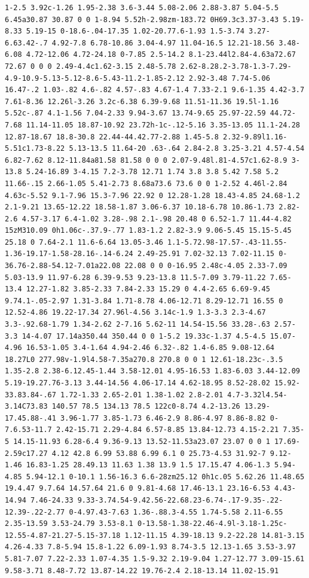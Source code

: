 \documentclass[11pt]{article}
\begin{document}
\begin{enumerate}
\begin{verbatim}
1-2.5 3.92c-1.26 1.95-2.38 3.6-3.44 5.08-2.06 2.88-3.87 5.04-5.5 6.45a30.87 30.87 0 0 1-8.94 5.52h-2.98zm-183.72 0H69.3c3.37-3.43 5.19-8.33 5.19-15 0-18.6-.04-17.35 1.02-20.77.6-1.93 1.5-3.74 3.27-6.63.42-.7 4.92-7.8 6.78-10.86 3.04-4.97 11.04-16.5 12.21-18.56 3.48-6.08 4.72-12.06 4.72-24.18 0-7.85 2.5-14.2 8.1-23.44l2.84-4.63a72.67 72.67 0 0 0 2.49-4.4c1.62-3.15 2.48-5.78 2.62-8.28.2-3.78-1.3-7.29-4.9-10.9-5.13-5.12-8.6-5.43-11.2-1.85-2.12 2.92-3.48 7.74-5.06 16.47-.2 1.03-.82 4.6-.82 4.57-.83 4.67-1.4 7.33-2.1 9.6-1.35 4.42-3.7 7.61-8.36 12.26l-3.26 3.2c-6.38 6.39-9.68 11.51-11.36 19.5l-1.16 5.52c-.87 4.1-1.56 7.04-2.33 9.94-3.67 13.74-9.65 25.97-22.59 44.72-7.68 11.14-11.05 18.87-10.92 23.72h-1c-.12-5.16 3.35-13.05 11.1-24.28 12.87-18.67 18.8-30.8 22.44-44.42.77-2.88 1.45-5.8 2.32-9.89l1.16-5.51c1.73-8.22 5.13-13.5 11.64-20 .63-.64 2.84-2.8 3.25-3.21 4.57-4.54 6.82-7.62 8.12-11.84a81.58 81.58 0 0 0 2.07-9.48l.81-4.57c1.62-8.9 3-13.8 5.24-16.89 3-4.15 7.2-3.78 12.71 1.74 3.8 3.8 5.42 7.58 5.2 11.66-.15 2.66-1.05 5.41-2.73 8.68a73.6 73.6 0 0 1-2.52 4.46l-2.84 4.63c-5.52 9.1-7.96 15.3-7.96 22.92 0 12.28-1.28 18.43-4.85 24.68-1.2 2.1-9.21 13.65-12.22 18.58-1.87 3.06-6.37 10.18-6.78 10.86-1.73 2.82-2.6 4.57-3.17 6.4-1.02 3.28-.98 2.1-.98 20.48 0 6.52-1.7 11.44-4.82 15zM310.09 0h1.06c-.37.9-.77 1.83-1.2 2.82-3.9 9.06-5.45 15.15-5.45 25.18 0 7.64-2.1 11.6-6.64 13.05-3.46 1.1-5.72.98-17.57-.43-11.55-1.36-19.17-1.58-28.16-.14-6.24 2.49-25.91 7.02-32.13 7.02-11.15 0-36.76-2.88-54.12-7.01a22.08 22.08 0 0 0-16.95 2.48c-4.05 2.33-7.09 5.03-13.9 11.97-6.28 6.39-9.53 9.23-13.8 11.5-7.09 3.79-11.22 7.65-13.4 12.27-1.82 3.85-2.33 7.84-2.33 15.29 0 4.4-2.65 6.69-9.45 9.74.1-.05-2.97 1.31-3.84 1.71-8.78 4.06-12.71 8.29-12.71 16.55 0 12.52-4.86 19.22-17.34 27.96l-4.56 3.14c-1.9 1.3-3.3 2.3-4.67 3.3-.92.68-1.79 1.34-2.62 2-7.16 5.62-11 14.54-15.56 33.28-.63 2.57-3.3 14-4.07 17.14a350.44 350.44 0 0 1-5.2 19.33c-1.37 4.5-4.5 15.07-4.96 16.53-1.05 3.4-1.64 4.94-2.46 6.32-.82 1.4-6.85 9.08-12.64 18.27L0 277.98v-1.9l4.58-7.35a270.8 270.8 0 0 1 12.61-18.23c-.3.5 1.35-2.8 2.38-6.12.45-1.44 3.58-12.01 4.95-16.53 1.83-6.03 3.44-12.09 5.19-19.27.76-3.13 3.44-14.56 4.06-17.14 4.62-18.95 8.52-28.02 15.92-33.83.84-.67 1.72-1.33 2.65-2.01 1.38-1.02 2.8-2.01 4.7-3.32l4.54-3.14C73.83 140.57 78.5 134.13 78.5 122c0-8.74 4.2-13.26 13.29-17.45.88-.41 3.96-1.77 3.85-1.73 6.46-2.9 8.86-4.97 8.86-8.82 0-7.6.53-11.7 2.42-15.71 2.29-4.84 6.57-8.85 13.84-12.73 4.15-2.21 7.35-5 14.15-11.93 6.28-6.4 9.36-9.13 13.52-11.53a23.07 23.07 0 0 1 17.69-2.59c17.27 4.12 42.8 6.99 53.88 6.99 6.1 0 25.73-4.53 31.92-7 9.12-1.46 16.83-1.25 28.49.13 11.63 1.38 13.9 1.5 17.15.47 4.06-1.3 5.94-4.85 5.94-12.1 0-10.1 1.56-16.3 6.6-28zm25.12 0h1c.05 5.62.26 11.48.65 19.4.47 9.7.64 14.57.64 21.6 0 9.81-4.68 17.46-13.1 23.16-6.53 4.43-14.94 7.46-24.33 9.33-3.74.54-9.42.56-22.68.23-6.74-.17-9.35-.22-12.39-.22-2.77 0-4.97.43-7.63 1.36-.88.3-4.55 1.74-5.58 2.11-6.55 2.35-13.59 3.53-24.79 3.53-8.1 0-13.58-1.38-22.46-4.9l-3.18-1.25c-12.55-4.87-21.27-5.15-37.18 1.12-11.15 4.39-18.13 9.2-22.28 14.81-3.15 4.26-4.33 7.8-5.94 15.8-1.22 6.09-1.93 8.74-3.5 12.13-1.65 3.53-3.97 5.81-7.07 7.22-2.33 1.07-4.35 1.5-9.32 2.19-9.04 1.27-12.77 3.09-15.61 9.58-3.71 8.48-7.72 13.87-14.22 19.76-2.4 2.18-13.14 11.02-15.91 
\end{verbatim}
\end{enumerate}
\end{document}
